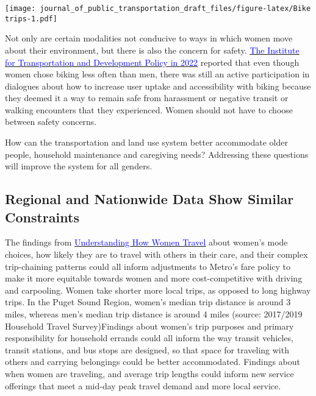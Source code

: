 \documentclass[
  12pt,
]{article}
\begin{document}
\texttt{[image: journal\_of\_public\_transportation\_draft\_files/figure-latex/Bike trips-1.pdf]}

\begin{flushleft}
Not only are certain modalities not conducive to ways in which women move about their environment, but there is also the concern for safety. \href{https://www.itdp.org/2022/07/06/cyclings-gender-gap/}{\underline{\textcolor{blue}{The Institute for Transportation and Development Policy in 2022}}} reported that even though women chose biking less often than men, there was still an active participation in dialogues about how to increase user uptake and accessibility with biking because they deemed it a way to remain safe from harassment or negative transit or walking encounters that they experienced. Women should not have to choose between safety concerns.

How can the transportation and land use system better accommodate older people, household maintenance and caregiving needs? Addressing these questions will improve the system for all genders.
\end{flushleft}

\hypertarget{regional-and-nationwide-data-show-similar-constraints}{%
\subsection{Regional and Nationwide Data Show Similar
Constraints}\label{regional-and-nationwide-data-show-similar-constraints}}

\begin{flushleft}
The findings from \href{https://thesource.metro.net/2019/09/19/metro-releases-understanding-how-women-travel-report/}{\underline{\textcolor{blue}{Understanding How Women Travel}}} about women’s mode choices, how likely they are to travel with others in their care, and their complex trip-chaining patterns could all inform adjustments to Metro’s fare policy to make it more equitable towards women and more cost-competitive with driving and carpooling. Women take shorter more local trips, as opposed to long highway trips. In the Puget Sound Region, women's median trip distance is around 3 miles, whereas men's median trip distance is around 4 miles (source: 2017/2019 Household Travel Survey)Findings about women’s trip purposes and primary responsibility for household errands could all inform the way transit vehicles, transit stations, and bus stops are designed, so that space for traveling with others and carrying  belongings could be better accommodated. Findings about when women are traveling, and average trip lengths could inform new service offerings that meet a mid-day peak travel demand and more local service. 
\end{flushleft}
\end{document}
